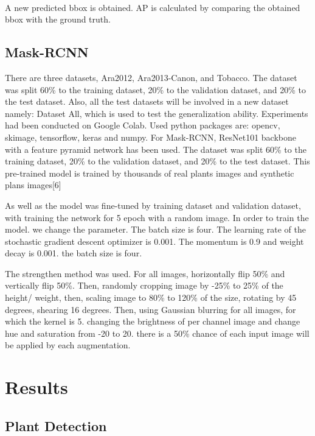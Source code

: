 \documentclass[conference]{IEEEtran}
\begin{document}
\paragraph{}A new predicted bbox is obtained. AP is calculated by comparing the obtained bbox with the ground truth.

\subsection{Mask-RCNN}
There are three datasets, Ara2012, Ara2013-Canon, and Tobacco. The dataset was split 60\% to the training dataset, 20\% to the validation dataset, and 20\% to the test dataset. Also, all the test datasets will be involved in a new dataset namely: Dataset All, which is used to test the generalization ability. Experiments had been conducted on Google Colab. Used python packages are: opencv, skimage, tensorflow, keras and numpy. For Mask-RCNN, ResNet101 backbone with a feature pyramid network has been used. The dataset was split 60\% to the training dataset, 20\% to the validation dataset, and 20\% to the test dataset. This pre-trained model is trained by thousands of real plants images and synthetic plans images[6]

As well as the model was fine-tuned by training dataset and validation dataset, with training the network for 5 epoch with a random image. In order to train the model. we change the parameter. The batch size is four. The learning rate of the stochastic gradient descent optimizer is 0.001. The momentum is 0.9 and weight decay is 0.001. the batch size is four. 

The strengthen method was used. For all images, horizontally flip 50\% and vertically flip 50\%. Then, randomly cropping image by -25\% to 25\% of the height/ weight, then, scaling image to 80\% to 120\% of the size, rotating by 45 degrees, shearing 16 degrees. Then, using Gaussian blurring for all images, for which the kernel is 5. changing the brightness of per channel image and change hue and saturation from -20 to 20. there is a 50\% chance of each input image will be applied by each augmentation.



\section{Results}
\subsection{Plant Detection}
\end{document}
